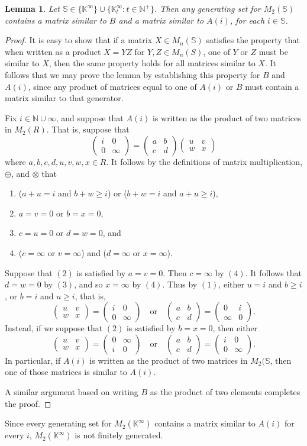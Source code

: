 \documentclass[11pt]{article}
\newtheorem{lemma}[thm]{Lemma}
\numberwithin{equation}{section}
\newcommand{\set}[2]{\ensuremath{\{#1 : #2 \}}}
\renewcommand{\S}{\mathbb{S}}
\newcommand{\N}{\mathbb{N}}
\newcommand{\Np}{\N^{+}}
\newcommand{\K}{\mathbb{K}}
\newcommand{\Kmin}{\K^{\infty}}
\newcommand{\Kmint}{\K^{\infty}_t}
\newcommand{\mat}[4]{\begin{pmatrix}#1&#2\\#3&#4\end{pmatrix}}
\begin{document}
\begin{lemma}
  Let $\S \in \{\Kmin\} \cup \set{\Kmint}{t \in \Np}$. Then any generating set
  for $M_{2}(\S)$ contains a matrix similar to $B$ and a matrix similar to
  $A(i)$, for each $i \in \S$.
\end{lemma}
\begin{proof}
It is easy to show that if a matrix $X \in M_n(\S)$ satisfies the property that
when written as a product $X = YZ$ for $Y, Z \in M_n(S)$, one of $Y$ or $Z$ must
be similar to $X$, then the same property holds for all matrices similar to $X$.
It follows that we may prove the lemma by establishing this property for $B$ and
$A(i)$, since any product of matrices equal to one of $A(i)$ or $B$ must contain
a matrix similar to that generator.

Fix $i \in \N\cup\infty$, and suppose that $A(i)$ is written as the product of
two matrices in $M_{2}(R)$. That is, suppose that 
\[\mat{i}{0}{0}{\infty} = \mat{a}{b}{c}{d} \mat{u}{v}{w}{x}\] 
where $a,b,c,d,u,v,w,x \in R$. It follows by
the definitions of matrix multiplication, $\oplus$, and $\otimes$ that
\begin{enumerate}[label=(\theenumi)]
  \item
    ($a + u = i$ and $b + w \geq i$) or ($b + w = i$ and $a + u \geq i$),
  \item
    $a = v = 0$ or $b = x = 0$,
  \item
    $c = u = 0$ or $d = w = 0$, and
  \item
    ($c = \infty$ or $v = \infty$) and ($d = \infty$ or $x = \infty$).
\end{enumerate}
Suppose that $(2)$ is satisfied by $a = v = 0$. Then $c = \infty$ by $(4)$.  It
follows that $d = w = 0$ by $(3)$, and so $x = \infty$ by $(4)$.  Thus by $(1)$,
either $u = i$ and $b \geq i$, or $b = i$ and $u \geq i$, that is,\
$$\mat{u}{v}{w}{x} = \mat{i}{0}{0}{\infty} \quad \text{or} \quad
\mat{a}{b}{c}{d} = \mat{0}{i}{\infty}{0}.$$
Instead, if we suppose that $(2)$ is satisfied by $b = x = 0$, then either
$$\mat{u}{v}{w}{x} = \mat{0}{\infty}{i}{0} \quad \text{or} \quad
\mat{a}{b}{c}{d} = \mat{i}{0}{0}{\infty}.$$
In particular, if $A(i)$ is written as the product of two matrices in
$M_{2}(\S$, then one of those matrices is similar to $A(i)$.

A similar argument based on writing $B$ as the product of two elements completes
the proof.
\end{proof}

Since every generating set for $M_2(\Kmin)$ contains a matrix similar to $A(i)$
for every $i$, $M_2(\Kmin)$ is not finitely generated.
\end{document}
